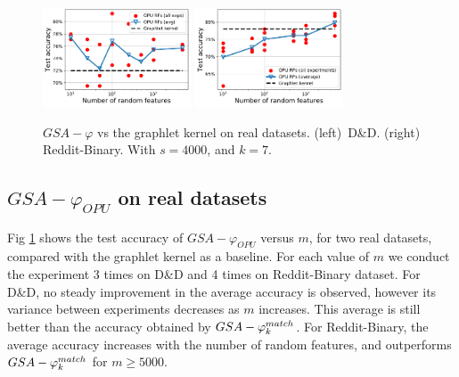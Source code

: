 \documentclass{article}
\begin{document}
\begin{figure}
\centering
%
  \includegraphics[width=4.4cm]{figs/DD.pdf}%
  \includegraphics[width=4.4cm]{figs/Reddit.pdf}%
%
\caption{ $GSA-\varphi$ vs the graphlet kernel on real datasets. (left)~D\&D. (right) Reddit-Binary. With $s=4000$, and $k=7$.}
\label{fig:DD}
%
\end{figure}

\subsection{$GSA-\varphi_{OPU}$  on real datasets}\label{sec:DD_Reddit}
Fig \ref{fig:DD} shows the test accuracy of $GSA-\varphi_{OPU}$ versus $m$, for two real datasets, compared with the graphlet kernel as a baseline. For each value of $m$ we conduct the experiment 3 times on D\&D and 4 times on Reddit-Binary dataset. For  D\&D, no steady improvement in the average accuracy is observed, however its variance between experiments decreases as $m$ increases. %
This average is still better than the accuracy obtained by $GSA-\varphi^{match}_k$. For Reddit-Binary, %
the average accuracy increases with the number of random features, and outperforms $GSA-\varphi^{match}_k$ for $m\geq5000$. 
\end{document}

